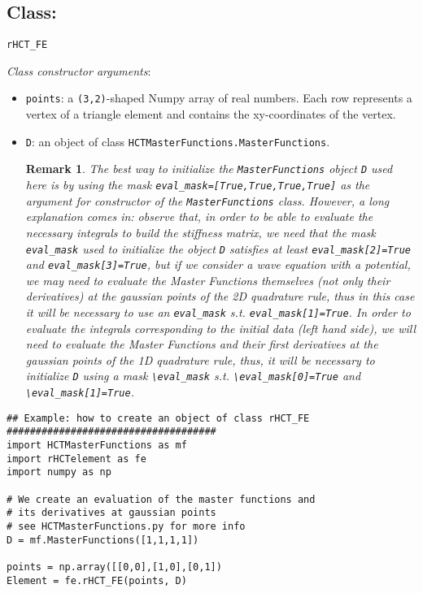\documentclass{amsart}
\theoremstyle{plain}
\newtheorem{remark}{Remark}
\theoremstyle{definition}
\theoremstyle{remark}
\numberwithin{equation}{section}
\begin{document}
\subsection{Class:} \verb|rHCT_FE|

\textit{Class constructor arguments}:
\begin{itemize}
\item  \verb|points|: a \verb|(3,2)|-shaped Numpy array of real numbers. Each row represents a vertex of a triangle element and contains the xy-coordinates of the vertex.
\item \verb|D|: an object of class \verb|HCTMasterFunctions.MasterFunctions|.
\begin{remark} The best way to initialize the \verb|MasterFunctions| object \verb|D| used here is by using the mask \verb|eval_mask=[True,True,True,True]| as the argument for constructor of the \verb|MasterFunctions| class. However, a long explanation comes in: observe that, in order to be able to evaluate the necessary integrals to build the stiffness matrix, we need that the mask \verb|eval_mask| used to initialize the object \verb|D| satisfies at least \verb|eval_mask[2]=True| and  \verb|eval_mask[3]=True|, but if we consider a wave equation with a potential, we may need to evaluate the Master Functions themselves (not only their derivatives) at the gaussian points of the 2D quadrature rule, thus in this case it will be necessary to use an \verb|eval_mask| s.t. \verb|eval_mask[1]=True|. In order to evaluate the integrals corresponding to the initial data (left hand side), we will need to evaluate the Master Functions and their first derivatives at the gaussian points of the 1D quadrature rule, thus, it will be necessary to initialize \verb|D| using a mask \verb|\eval_mask| s.t. \verb|\eval_mask[0]=True| and \verb|\eval_mask[1]=True|.
\end{remark}
\end{itemize}

\begin{lstlisting}
## Example: how to create an object of class rHCT_FE
####################################
import HCTMasterFunctions as mf
import rHCTelement as fe
import numpy as np

# We create an evaluation of the master functions and
# its derivatives at gaussian points
# see HCTMasterFunctions.py for more info
D = mf.MasterFunctions([1,1,1,1])

points = np.array([[0,0],[1,0],[0,1])
Element = fe.rHCT_FE(points, D)
\end{lstlisting}
\end{document}
